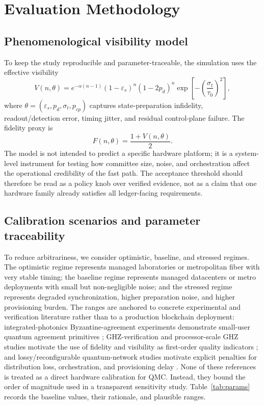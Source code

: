 \documentclass{ieeeaccess}
\begin{document}
\section{Evaluation Methodology}
\label{sec:method}
\subsection{Phenomenological visibility model}
To keep the study reproducible and parameter-traceable, the simulation uses the effective visibility
\begin{equation}
V(n,\theta)=e^{-\alpha (n-1)}(1-\varepsilon_s)^n(1-2p_d)^n\exp\!\left[-\left(\frac{\sigma_t}{\tau_0}\right)^2\right],
\label{eq:visibility}
\end{equation}
where $\theta=(\varepsilon_s,p_d,\sigma_t,p_{cp})$ captures state-preparation infidelity, readout/detection error, timing jitter, and residual control-plane failure. The fidelity proxy is
\begin{equation}
F(n,\theta)=\frac{1+V(n,\theta)}{2}.
\label{eq:fidelity}
\end{equation}
The model is not intended to predict a specific hardware platform; it is a system-level instrument for testing how committee size, noise, and orchestration affect the operational credibility of the fast path. The acceptance threshold should therefore be read as a policy knob over verified evidence, not as a claim that one hardware family already satisfies all ledger-facing requirements.

\subsection{Calibration scenarios and parameter traceability}
To reduce arbitrariness, we consider optimistic, baseline, and stressed regimes. The optimistic regime represents managed laboratories or metropolitan fiber with very stable timing; the baseline regime represents managed datacenters or metro deployments with small but non-negligible noise; and the stressed regime represents degraded synchronization, higher preparation noise, and higher provisioning burden. The ranges are anchored to concrete experimental and verification literature rather than to a production blockchain deployment: integrated-photonics Byzantine-agreement experiments demonstrate small-user quantum agreement primitives \cite{b12}; GHZ-verification and processor-scale GHZ studies motivate the use of fidelity and visibility as first-order quality indicators \cite{b19,b20,b21}; and lossy/reconfigurable quantum-network studies motivate explicit penalties for distribution loss, orchestration, and provisioning delay \cite{b22,b23}. None of these references is treated as a direct hardware calibration for QMC. Instead, they bound the order of magnitude used in a transparent sensitivity study. Table~\ref{tab:params} records the baseline values, their rationale, and plausible ranges.
\end{document}
